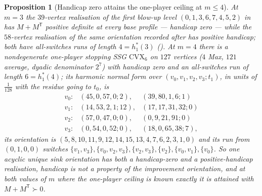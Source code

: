 \documentclass[11pt]{article}
\theoremstyle{plain}
\newtheorem{proposition}[theorem]{Proposition}
\theoremstyle{definition}
\begin{document}
\begin{proposition}[Handicap zero attains the one-player ceiling at $m\le4$]\label{prop:handicap-zero-ceiling}
At $m=3$ the $39$-vertex realisation of the first blow-up level
$(0,1,3,6,7,4,5,2)$ in  has $M+M^{\mathsf T}$
positive definite at every base profile --- handicap zero --- while the
$58$-vertex realisation of the same orientation recorded after
 has positive handicap; both have all-switches
runs of length $4=h^{\ast}_{1}(3)$ (). At $m=4$ there
is a nondegenerate one-player stopping SSG $\mathrm{CVX}_6$ on $127$
vertices ($4$ Max, $121$ average, dyadic denominator $2^{7}$) with
handicap zero and an all-switches run of length $6=h^{\ast}_{1}(4)$; its
harmonic normal form over $(v_0,v_1,v_2,v_3;t_1)$, in units of
$\tfrac1{128}$ with the residue going to $t_0$, is
\[
  \begin{array}{lll}
   v_0:&(45,0,57,0;2),&(39,80,1,6;1)\\
   v_1:&(14,53,2,1;12),&(17,17,31,32;0)\\
   v_2:&(57,0,47,0;0),&(0,9,21,91;0)\\
   v_3:&(0,54,0,52;0),&(18,0,65,38;7),
  \end{array}
\]
its orientation is $(5,8,10,11,9,12,14,15,13,4,7,6,2,3,1,0)$ and its run
from $(0,1,0,0)$ switches
$\{v_1,v_3\},\{v_0,v_2,v_3\},\{v_2,v_3\},\{v_2\},\{v_0,v_1\},\{v_0\}$. So
one acyclic unique sink orientation has both a handicap-zero and a
positive-handicap realisation, handicap is not a property of the
improvement orientation, and at both values of $m$ where the one-player
ceiling is known exactly it is attained with $M+M^{\mathsf T}\succ0$.
\end{proposition}
\end{document}
